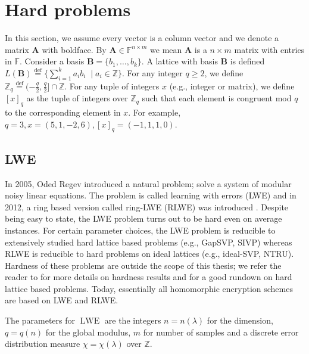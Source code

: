 \chapter{Hard problems}\label{sec:hard_problems}

In this section, we assume every vector is a column vector and we denote a matrix $\textbf{A}$ with boldface. By $\textbf{A} \in \mathbb{F}^{n \times m}$ we mean $\textbf{A}$ is a $n \times m$ matrix with entries in $\mathbb{F}$. Consider a basis $\textbf{B} = \{b_1, \dots, b_k\}$. A lattice with basis $\textbf{B}$ is defined $L(\textbf{B}) \stackrel{\mathrm{def}}{=} \{ \sum_{i=1}^k a_i b_i \; \mid a_i \in \mathbb{Z}\}$. For any integer $q \geq 2$, we define $\mathbb{Z}_q \stackrel{\mathrm{def}}{=} (-\frac{q}{2}, \frac{q}{2}] \cap \mathbb{Z}$. For any tuple of integers $x$ (e.g., integer or matrix), we define $[x]_q$ as the tuple of integers over $\mathbb{Z}_q$ such that each element is congruent mod $q$ to the corresponding element in $x$. For example, $q = 3, x = (5,1,-2,6), [x]_q = (-1,1,1,0)$.

\section{LWE}\label{subsec:LWE}
In 2005, Oded Regev introduced \cite{Reg05-LWE} a natural problem; solve a system of modular noisy linear equations. The problem is called learning with errors (LWE) and in 2012, a ring based version called ring-LWE (RLWE) was introduced \cite{RLWE}. Despite being easy to state, the LWE problem turns out to be hard even on average instances. For certain parameter choices, the LWE problem is reducible to extensively studied hard lattice based problems (e.g., GapSVP, SIVP) whereas RLWE is reducible to hard problems on ideal lattices (e.g., ideal-SVP, NTRU). Hardness of these problems are outside the scope of this thesis; we refer the reader to \cite{Reg05-LWE, LWE-classical-reduction, LWE-hardness, RLWE} for more details on hardness results and \cite{Pei16-decade} for a good rundown on hard lattice based problems. Today, essentially all homomorphic encryption schemes are based on LWE and RLWE.

The parameters for $\operatorname{LWE}$ are the integers $n = n(\lambda)$ for the dimension, $q = q(n)$ for the global modulus, $m$ for number of samples and a discrete error distribution measure $\chi = \chi(\lambda)$ over $\mathbb{Z}$.

